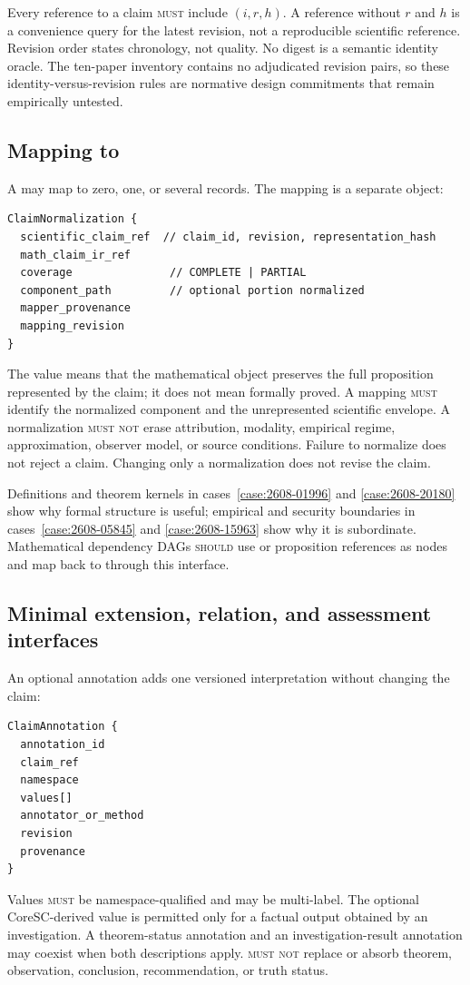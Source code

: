 Every reference to a claim \textsc{must} include $(i,r,h)$. A reference without $r$ and $h$ is a convenience query for the latest revision, not a reproducible scientific reference. Revision order states chronology, not quality. No digest is a semantic identity oracle. The ten-paper inventory contains no adjudicated revision pairs, so these identity-versus-revision rules are normative design commitments that remain empirically untested.

\subsection{Mapping to \MathClaimIR{}}

A \ScientificClaim{} may map to zero, one, or several \MathClaimIR{} records. The mapping is a separate object:

\begin{lstlisting}[style=interface]
ClaimNormalization {
  scientific_claim_ref  // claim_id, revision, representation_hash
  math_claim_ir_ref
  coverage               // COMPLETE | PARTIAL
  component_path         // optional portion normalized
  mapper_provenance
  mapping_revision
}
\end{lstlisting}

The value  means that the mathematical object preserves the full proposition represented by the claim; it does not mean formally proved. A  mapping \textsc{must} identify the normalized component and the unrepresented scientific envelope. A normalization \textsc{must not} erase attribution, modality, empirical regime, approximation, observer model, or source conditions. Failure to normalize does not reject a claim. Changing only a normalization does not revise the claim.

Definitions and theorem kernels in cases~\ref{case:2608-01996} and \ref{case:2608-20180} show why formal structure is useful; empirical and security boundaries in cases~\ref{case:2608-05845} and \ref{case:2608-15963} show why it is subordinate. Mathematical dependency DAGs \textsc{should} use \MathClaimIR{} or proposition references as nodes and map back to \ScientificClaim{} through this interface.

\subsection{Minimal extension, relation, and assessment interfaces}

An optional annotation adds one versioned interpretation without changing the claim:
\begin{lstlisting}[style=interface]
ClaimAnnotation {
  annotation_id
  claim_ref
  namespace
  values[]
  annotator_or_method
  revision
  provenance
}
\end{lstlisting}
Values \textsc{must} be namespace-qualified and may be multi-label. The optional CoreSC-derived value  is permitted only for a factual output obtained by an investigation. A theorem-status annotation and an investigation-result annotation may coexist when both descriptions apply.  \textsc{must not} replace or absorb theorem, observation, conclusion, recommendation, or truth status.

